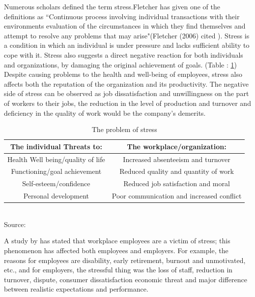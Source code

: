 Numerous scholars defined the term stress.Fletcher has given one of the definitions as  “Continuous process involving individual transactions with their environments evaluation of the circumstances in which they find themselves and attempt to resolve any problems that may arise"(Fletcher (2006) cited \citep{Rumbold2012APerformers.}). Stress is a condition in which an individual is under pressure and lacks sufficient ability to cope with it. Stress also suggests a direct negative reaction for both individuals and organizations, by damaging the original achievement of goals. (Table : \ref{tab:problem-stress}) Despite causing problems to the health and well-being of employees, stress also affects both the reputation of the organization and its productivity.  The negative side of stress can be observed as job dissatisfaction and unwillingness on the part of workers to their jobs, the reduction in the level of production and turnover and deficiency in the quality of work would be the company's demerits.

\begin{table}[ht!]
\centering
\caption[The problem of stress]{The problem of stress}
\begin{tabular}{|c|c|}
\hline
\textbf{The individual Threats to:} & \textbf{The workplace/organization:} \\ \hline
Health Well being/quality of life & Increased absenteeism and turnover \\ \hline
Functioning/goal achievement & Reduced quality and quantity of work \\ \hline
Self-esteem/confidence & Reduced job satisfaction and moral \\ \hline
Personal development & Poor communication and increased conflict \\ \hline
\end{tabular}\\
\footnotesize Source: \citep{Michie2002CausesWork.}
\label{tab:problem-stress}
\end{table}

A study by \citep{Michie2002CausesWork.} has stated that workplace employees are a victim of stress; this phenomenon has affected both employees and employers.  For example, the reasons for employees are disability, early retirement, burnout and unmotivated, etc., and for employers, the stressful thing was the loss of staff, reduction in turnover, dispute, consumer dissatisfaction economic threat and major difference between realistic expectations and performance.

